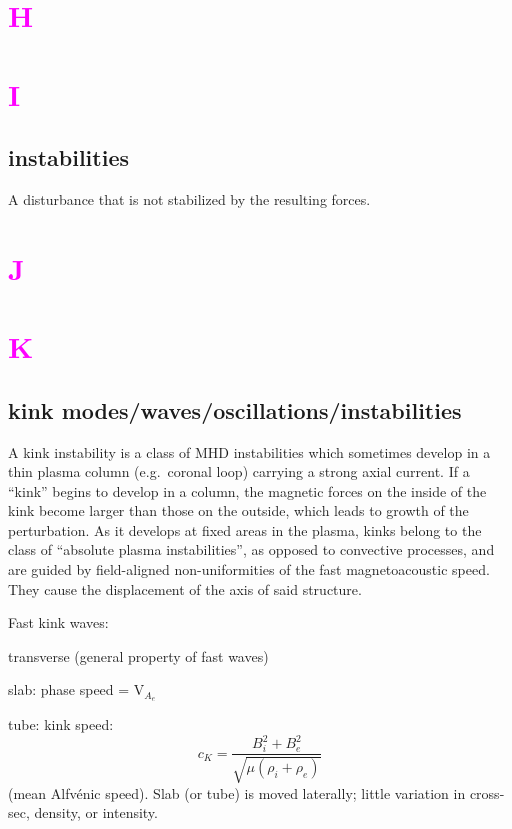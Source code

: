 \documentclass[12pt]{article}
\begin{document}
\section*{\textcolor{magenta}{H}}

\section*{\textcolor{magenta}{I}}
\subsection*{instabilities}
A disturbance that is not stabilized by the resulting forces.

\section*{\textcolor{magenta}{J}}
\section*{\textcolor{magenta}{K}}

\subsection*{kink modes/waves/oscillations/instabilities}
A kink instability is a class of MHD instabilities which sometimes develop
in a thin plasma column (e.g.\ coronal loop) carrying a strong axial current.
If a ``kink'' begins to develop in a column, the magnetic forces
on the inside of the kink become larger than those on the outside,
which leads to growth of the perturbation. As it develops at fixed
areas in the plasma, kinks belong to the class of ``absolute plasma
instabilities'', as opposed to convective processes, and are guided by
field-aligned non-uniformities of the fast magnetoacoustic speed.
They cause the displacement of the axis of said
structure.

Fast kink waves:
\begin{itemize*}
    \item transverse (general property of fast waves)
    \item slab: phase speed = V$_{A_e}$
    \item tube: kink speed:
        $$ c_K = \frac{B_i^2 + B_e^2}{\sqrt{\mu(\rho_i+\rho_e)}} $$
        (mean Alfv\'enic speed).
        Slab (or tube) is moved laterally; little variation in cross-sec,
        density, or intensity.
\end{itemize*}
\end{document}
